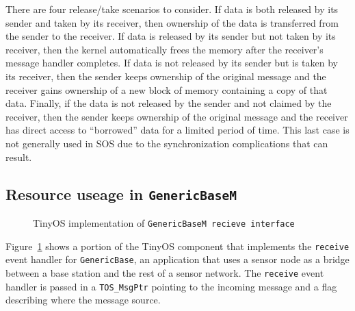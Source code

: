 There are four release/take scenarios to consider.  If data is both
released by its sender and taken by its receiver, then ownership of
the data is transferred from the sender to the receiver.  If data is
released by its sender but not taken by its receiver, then the kernel
automatically frees the memory after the receiver's message handler
completes.  If data is not released by its sender but is taken by its
receiver, then the sender keeps ownership of the original message and
the receiver gains ownership of a new block of memory containing a
copy of that data.  Finally, if the data is not released by the sender
and not claimed by the receiver, then the sender keeps ownership of
the original message and the receiver has direct access to
``borrowed'' data for a limited period of time.  This last case is not
generally used in SOS due to the synchronization complications that
can result.


\subsection{Resource useage in {\tt GenericBaseM}}

\begin{figure}[t]

\caption{TinyOS implementation of {\tt GenericBaseM recieve
interface}\label{fig:genericbase}}
\end{figure}


Figure~\ref{fig:genericbase} shows a portion of the TinyOS component that
implements the {\tt receive} event handler for {\tt GenericBase}, an
application that uses a sensor node as a bridge between a base station
and the rest of a sensor network.  The {\tt receive} event handler is
passed in a {\tt TOS\_MsgPtr} pointing to the incoming message and a
flag describing where the message source.


